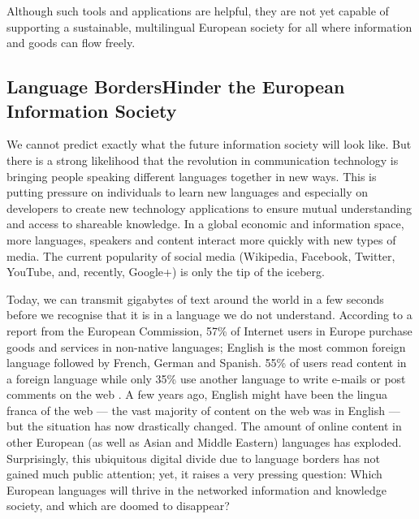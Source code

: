 \begin{multicols}{2}
Although such tools and applications are helpful, they are not yet capable of supporting a sustainable, multilingual European society for all where information and goods can flow freely.

\subsection[Language Borders Hold back the European Information Society]{Language Borders\newline Hinder the European Information Society}

    We cannot predict exactly what the future information society will look like. But there is a strong likelihood that the revolution in communication technology is bringing people speaking different languages together in new ways. This is putting pressure on individuals to learn new languages and especially on developers to create new technology applications to ensure mutual understanding and access to shareable knowledge. In a global economic and information space, more languages, speakers and content interact more quickly with new types of media. The current popularity of social media (Wikipedia, Facebook, Twitter, YouTube, and, recently, Google+) is only the tip of the iceberg.


    Today, we can transmit gigabytes of text around the world in a few seconds before we recognise that it is in a language we do not understand. According to a report from the European Commission, 57\% of Internet users in Europe purchase goods and services in non-native languages; English is the most common foreign language followed by French, German and Spanish. 55\% of users read content in a foreign language while only 35\% use another language to write e-mails or post comments on the web \cite{GAL-Nota1}. A few years ago, English might have been the lingua franca of the web — the vast majority of content on the web was in English — but the situation has now drastically changed. The amount of online content in other European (as well as Asian and Middle Eastern) languages has exploded. Surprisingly, this ubiquitous digital divide due to language borders has not gained much public attention; yet, it raises a very pressing question: Which European languages will thrive in the networked information and knowledge society, and which are doomed to disappear?


\end{multicols}
